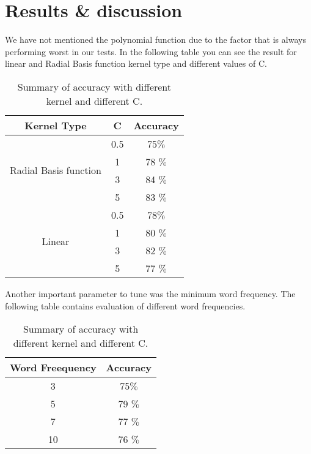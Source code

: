 \section{Results \& discussion}
\label{sec:resul}

We have not mentioned the polynomial function due to the factor that is always performing worst in our tests.
In the following table you can see the result for linear and Radial Basis function kernel type and different values of C.

\begin{table}[!ht]
	\begin{center}
	\begin{tabular}{ccc}
		\hline
		Kernel Type  & C & Accuracy  \\ 
		\hline
		\multirow{4}{*}{Radial Basis function}       & 0.5     & 75$\%$ \\
				 & 1        & 78 $\%$         \\
				 & 3        & 84  $\%$       \\
				 & 5        & 83 $\%$    	    \\
		\hline
		\multirow{4}{*}{Linear}       & 0.5     & 78$\%$ \\
				 & 1        & 80 $\%$         \\
				 & 3        & 82  $\%$       \\
				 & 5        & 77 $\%$    	    \\ \hline
	\end{tabular}
	\end{center}
	\caption{Summary of accuracy with different kernel and different C.}
	\label{tb:table2}
\end{table}	

Another important parameter to tune was the minimum word frequency. The following table contains evaluation of different word frequencies.


\begin{table}[!ht]
	\begin{center}
	\begin{tabular}{cc}
		\hline
		Word Freequency & Accuracy  \\ 
		\hline
		3      & 75$\%$ \\
				5  & 79 $\%$         \\
				   7 & 77  $\%$       \\
				 10    & 76 $\%$    	    \\
		\hline
	\end{tabular}
	\end{center}
	\caption{Summary of accuracy with different kernel and different C.}
	\label{tb:table3}
\end{table}	



